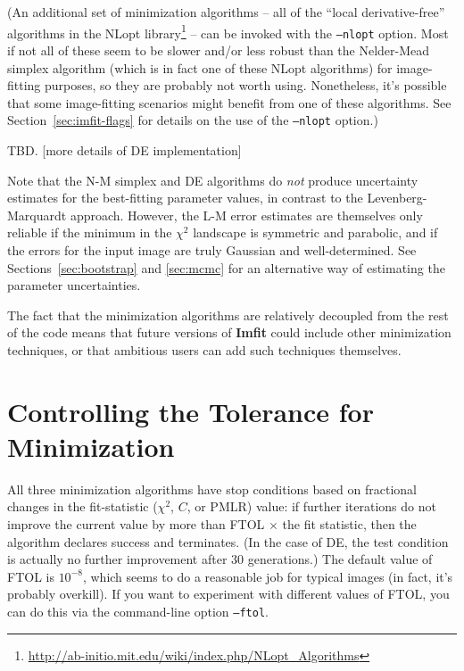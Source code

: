 \documentclass[10pt,a4paper,article]{memoir}
\newcommand{\imfit}{\textbf{Imfit}}
\newcommand{\chisquare}{\ensuremath{\chi^{2}}}
\newcommand{\pmlr}{PMLR}
\begin{document}
(An additional set of minimization algorithms -- all of the ``local
derivative-free'' algorithms in the NLopt
library\footnote{\url{http://ab-initio.mit.edu/wiki/index.php/NLopt_Algorithms}} -- can be invoked
with the \texttt{--nlopt} option. Most if not all of these seem to be
slower and/or less robust than the Nelder-Mead simplex algorithm (which
is in fact one of these NLopt algorithms) for image-fitting purposes, so
they are probably not worth using. Nonetheless, it's possible that some
image-fitting scenarios might benefit from one of these algorithms. See
Section~\ref{sec:imfit-flags} for details on the use of the
\texttt{--nlopt} option.)

\medskip

TBD. [more details of DE implementation]


\medskip

Note that the N-M simplex and DE algorithms do \textit{not} produce
uncertainty estimates for the best-fitting parameter values, in contrast
to the Levenberg-Marquardt approach. However, the L-M error estimates
are themselves only reliable if the minimum in the \chisquare{}
landscape is symmetric and parabolic, and if the errors for the input
image are truly Gaussian and well-determined.  See
Sections~\ref{sec:bootstrap} and \ref{sec:mcmc} for an alternative way of estimating the
parameter uncertainties.

\medskip

The fact that the minimization algorithms are relatively decoupled from the rest
of the code means that future versions of \imfit{} could include
other minimization techniques, or that ambitious users can add such techniques
themselves.


\section{Controlling the Tolerance for Minimization}

All three minimization algorithms have stop conditions based on
fractional changes in the fit-statistic (\chisquare{}, $C$, or \pmlr)
value: if further iterations do not improve the current value by more
than FTOL $\times$ the fit statistic, then the algorithm declares success and
terminates. (In the case of DE, the test condition is actually no
further improvement after 30 generations.) The default value of FTOL is
$10^{-8}$, which seems to do a reasonable job for typical images (in
fact, it's probably overkill). If you want to experiment with different
values of FTOL, you can do this via the command-line option
\texttt{--ftol}.
\end{document}
